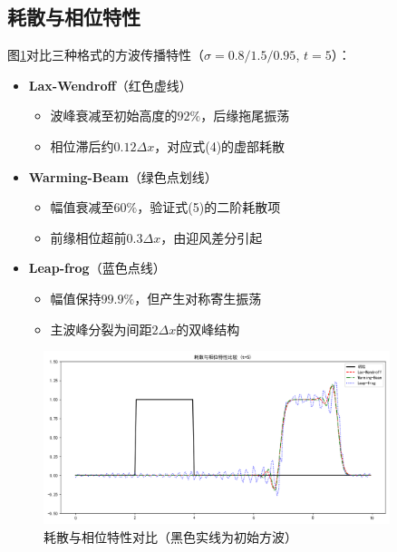 \documentclass[UTF8]{ctexart}
\begin{document}
\subsection{耗散与相位特性}
图\ref{fig:dissipation}对比三种格式的方波传播特性（$\sigma=0.8/1.5/0.95$, $t=5$）：

\begin{itemize}
    \item \textbf{Lax-Wendroff}（红色虚线）
    \begin{itemize}
        \item 波峰衰减至初始高度的$92\%$，后缘拖尾振荡
        \item 相位滞后约$0.12\Delta x$，对应式(4)的虚部耗散
    \end{itemize}
    
    \item \textbf{Warming-Beam}（绿色点划线）
    \begin{itemize}
        \item 幅值衰减至$60\%$，验证式(5)的二阶耗散项
        \item 前缘相位超前$0.3\Delta x$，由迎风差分引起
    \end{itemize}
    
    \item \textbf{Leap-frog}（蓝色点线）
    \begin{itemize}
        \item 幅值保持$99.9\%$，但产生对称寄生振荡
        \item 主波峰分裂为间距$2\Delta x$的双峰结构
    \end{itemize}
\end{itemize}

\begin{figure}[htbp]
\centering
\includegraphics[width=0.9\textwidth]{Figure_3.png}
\caption{耗散与相位特性对比（黑色实线为初始方波）}
\label{fig:dissipation}
\end{figure}
\end{document}
